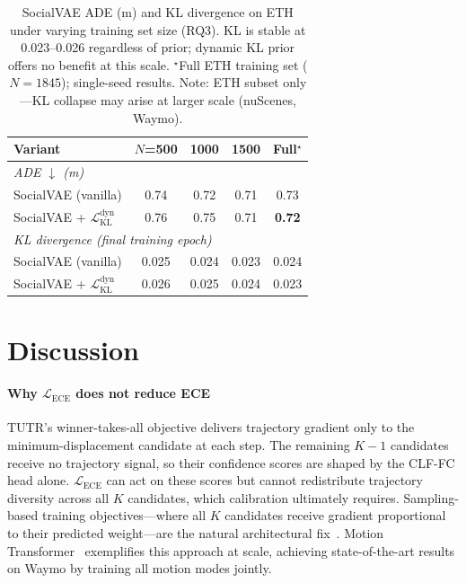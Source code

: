\documentclass[journal]{IEEEtran}
\begin{document}
\begin{table}[t]
\caption{SocialVAE ADE (m) and KL divergence on ETH under varying training
  set size (RQ3). KL is stable at 0.023--0.026 regardless of prior;
  dynamic KL prior offers no benefit at this scale.
  $^\star$Full ETH training set ($N=1845$); single-seed results.
  Note: ETH subset only---KL collapse may arise at larger scale (nuScenes, Waymo).}
\label{tab:socialvae}
\centering
\setlength{\tabcolsep}{5pt}
\begin{tabular}{l c c c c}
\toprule
Variant & $N$=500 & 1000 & 1500 & Full$^\star$ \\
\midrule
\multicolumn{5}{l}{\textit{ADE $\downarrow$ (m)}} \\[1pt]
SocialVAE (vanilla)                         & 0.74 & 0.72 & 0.71 & 0.73 \\
SocialVAE + $\mathcal{L}_\mathrm{KL}^\mathrm{dyn}$ & 0.76 & 0.75 & 0.71 & \textbf{0.72} \\
\midrule
\multicolumn{5}{l}{\textit{KL divergence (final training epoch)}} \\[1pt]
SocialVAE (vanilla)                         & 0.025 & 0.024 & 0.023 & 0.024 \\
SocialVAE + $\mathcal{L}_\mathrm{KL}^\mathrm{dyn}$ & 0.026 & 0.025 & 0.024 & 0.023 \\
\bottomrule
\end{tabular}
\end{table}

\section{Discussion}
\label{sec:discussion}

\paragraph{Why $\mathcal{L}_{\text{ECE}}$ does not reduce ECE}
TUTR's winner-takes-all objective delivers trajectory gradient only to
the minimum-displacement candidate at each step.
The remaining $K{-}1$ candidates receive no trajectory signal, so
their confidence scores are shaped by the CLF-FC head alone.
$\mathcal{L}_{\text{ECE}}$ can act on these scores but cannot
redistribute trajectory diversity across all $K$ candidates, which
calibration ultimately requires.
Sampling-based training objectives---where all $K$ candidates receive
gradient proportional to their predicted weight---are the natural
architectural fix~\cite{karandikar2021soft}. Motion Transformer~\cite{shi2023mtr} exemplifies this approach at scale, achieving state-of-the-art results on Waymo by training all motion modes jointly.
\end{document}
